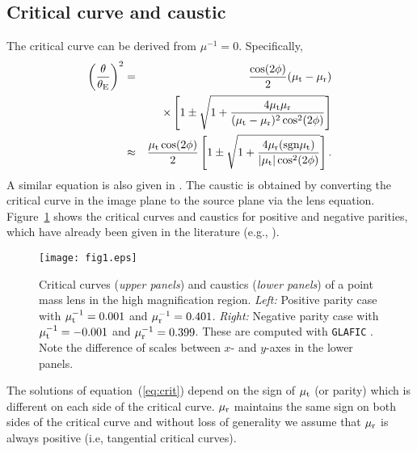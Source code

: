 \documentclass[showpacs,twocolumn,preprintnumbers,amsmath,amssymb,superscriptaddress,nofootinbib]{revtex4}
\begin{document}
\subsection{Critical curve and caustic}

The critical curve can be derived from $\mu^{-1}=0$. Specifically,
\begin{eqnarray}
\left(\frac{\theta}{\theta_{\rm
    E}}\right)^2&=&\frac{\cos(2\phi)}{2}(\mu_{\rm t}-\mu_{\rm
  r})\nonumber\\
  &&\times \left[1\pm\sqrt{1+\frac{4\mu_{\rm t}\mu_{\rm r}}{(\mu_{\rm t}-\mu_{\rm
  r})^2\cos^2(2\phi)}}\right]\nonumber\\
 & \approx & \frac{\mu_{\rm t}\cos(2\phi)}{2}
  \left[1\pm\sqrt{1+\frac{4\mu_{\rm r}({\rm sgn\mu_{\rm
            t}})}{|\mu_{\rm t}|\cos^2(2\phi)}}\right].
  \label{eq:crit}
\end{eqnarray}
A similar equation is also given in \cite{Diego:2017drh}. The caustic
is obtained by converting the critical curve in the image plane to the
source plane via the lens equation. Figure~\ref{fig:crit} shows 
the critical curves and caustics for positive and negative parities,
which have already been given in the literature (e.g., \cite{Chang:1979zz}).

\begin{figure*}[t]
\begin{center}
\texttt{[image: fig1.eps]}
\end{center}
\caption{Critical curves ({\it upper panels}) and caustics ({\it lower
    panels}) of a point mass lens in the high magnification
  region. {\it Left:} Positive parity case with $\mu_{\rm
    t}^{-1}=0.001$ and $\mu_{\rm r}^{-1}=0.401$.
  {\it Right:} Negative parity case with $\mu_{\rm
    t}^{-1}=-0.001$ and $\mu_{\rm r}^{-1}=0.399$. These are computed
  with {\tt GLAFIC} \cite{Oguri:2010rh}. Note the difference of scales
  between $x$- and $y$-axes in the lower panels.} 
\label{fig:crit}
\end{figure*}

The solutions of equation~(\ref{eq:crit}) depend on the sign of
$\mu_{\rm t}$ (or parity) which is different on each side of the
critical curve.  $\mu_{\rm r}$ maintains the same sign on both sides
of the critical curve and without loss of generality we assume that
$\mu_{\rm r}$ is always positive (i.e, tangential critical curves).  
\end{document}
